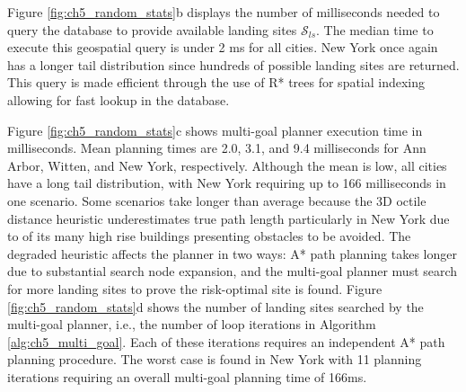 Figure \ref{fig:ch5_random_stats}b displays the number of milliseconds needed to query the database to provide available landing sites $\mathcal{S}_{ls}$. The median time to execute this geospatial query is under 2 ms for all cities. New York once again has a longer tail distribution since hundreds of possible landing sites are returned. This query is made efficient through the use of R* trees for spatial indexing allowing for fast lookup in the database.

Figure \ref{fig:ch5_random_stats}c shows multi-goal planner execution time in milliseconds.  Mean planning times are 2.0, 3.1, and 9.4 milliseconds for Ann Arbor, Witten, and New York, respectively. Although the mean is low, all cities have a long tail distribution, with New York requiring up to 166 milliseconds in one scenario. Some scenarios take longer than average because the 3D octile distance heuristic underestimates true path length particularly in New York due to of its many high rise buildings presenting obstacles to be avoided. The degraded heuristic affects the planner in two ways: A* path planning takes longer due to substantial search node expansion, and the multi-goal planner must search for more landing sites to prove the risk-optimal site is found. Figure \ref{fig:ch5_random_stats}d shows the number of landing sites searched by the multi-goal planner, i.e., the number of loop iterations in Algorithm \ref{alg:ch5_multi_goal}. Each of these iterations requires an independent A* path planning procedure. The worst case is found in New York with 11 planning iterations requiring an overall multi-goal planning time of 166ms.  




